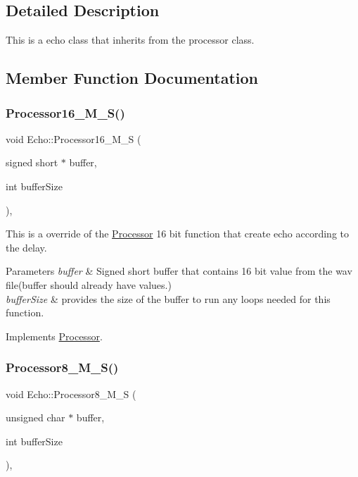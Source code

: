 \subsection{Detailed Description}
This is a echo class that inherits from the processor class. 

\subsection{Member Function Documentation}
\mbox{\label{classEcho_ad68f1fabcbac2646c70aded5904b3a2c}} 
\subsubsection{\texorpdfstring{Processor16\+\_\+\+M\+\_\+\+S()}{Processor16\_M\_S()}}
{\footnotesize\ttfamily void Echo\+::\+Processor16\+\_\+\+M\+\_\+S (\begin{DoxyParamCaption}\item[{signed short $\ast$}]{buffer,  }\item[{int}]{buffer\+Size }\end{DoxyParamCaption})\hspace{0.3cm}{\ttfamily [override]}, {\ttfamily [virtual]}}



This is a override of the \hyperlink{classProcessor}{Processor} 16 bit function that create echo according to the delay. 


\begin{DoxyParams}{Parameters}
{\em buffer} & Signed short buffer that contains 16 bit value from the wav file(buffer should already have values.) \\
\hline
{\em buffer\+Size} & provides the size of the buffer to run any loops needed for this function. \\
\hline
\end{DoxyParams}


Implements \hyperlink{classProcessor_a2a0903d1ca9e627e8a45e5159ecc0505}{Processor}.

\mbox{\label{classEcho_af4337545ebf5602337e605376bfa8dc3}} 
\subsubsection{\texorpdfstring{Processor8\+\_\+\+M\+\_\+\+S()}{Processor8\_M\_S()}}
{\footnotesize\ttfamily void Echo\+::\+Processor8\+\_\+\+M\+\_\+S (\begin{DoxyParamCaption}\item[{unsigned char $\ast$}]{buffer,  }\item[{int}]{buffer\+Size }\end{DoxyParamCaption})\hspace{0.3cm}{\ttfamily [override]}, {\ttfamily [virtual]}}



